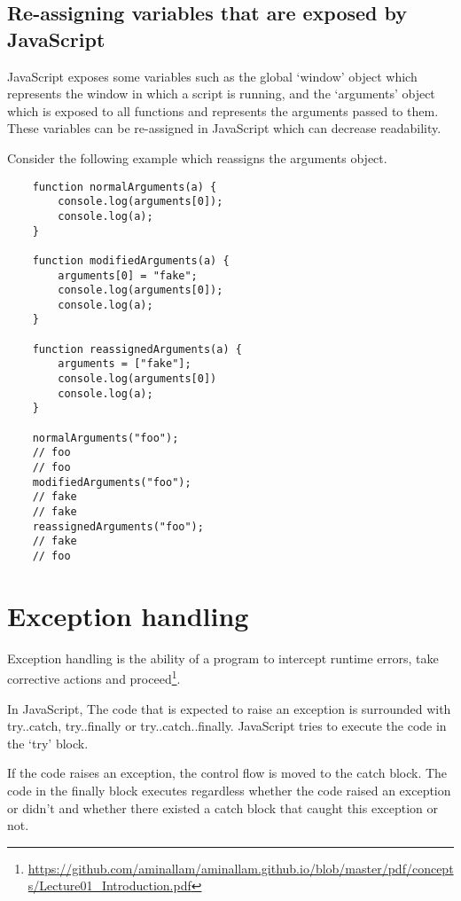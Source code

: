 \documentclass[11pt,a4paper]{article}
\begin{document}
\subsection{Re-assigning variables that are exposed by JavaScript}
JavaScript exposes some variables such as the global `window' object
which represents the window in which a script is running,
and the `arguments' object which is exposed to all functions and represents the arguments passed to them.
These variables can be re-assigned in JavaScript which can decrease readability.

Consider the following example which reassigns the arguments object.
\begin{verbatim}
    function normalArguments(a) {
        console.log(arguments[0]);
        console.log(a);
    }

    function modifiedArguments(a) {
        arguments[0] = "fake";
        console.log(arguments[0]);
        console.log(a);
    }

    function reassignedArguments(a) {
        arguments = ["fake"];
        console.log(arguments[0])
        console.log(a);
    }

    normalArguments("foo");
    // foo
    // foo
    modifiedArguments("foo");
    // fake
    // fake
    reassignedArguments("foo");
    // fake
    // foo
\end{verbatim}

\section{Exception handling}
Exception handling is the ability of a program to intercept runtime errors, take corrective actions and
proceed\footnote{\raggedright
    \url{https://github.com/aminallam/aminallam.github.io/blob/master/pdf/concepts/Lecture01_Introduction.pdf}
}.

In JavaScript,
The code that is expected to raise an exception is surrounded with try..catch, try..finally or try..catch..finally.
JavaScript tries to execute the code in the `try' block.

If the code raises an exception, the control flow is moved to the catch block.
The code in the finally block executes regardless whether the code raised an exception or didn't
and whether there existed a catch block that caught this exception or not.
\end{document}
